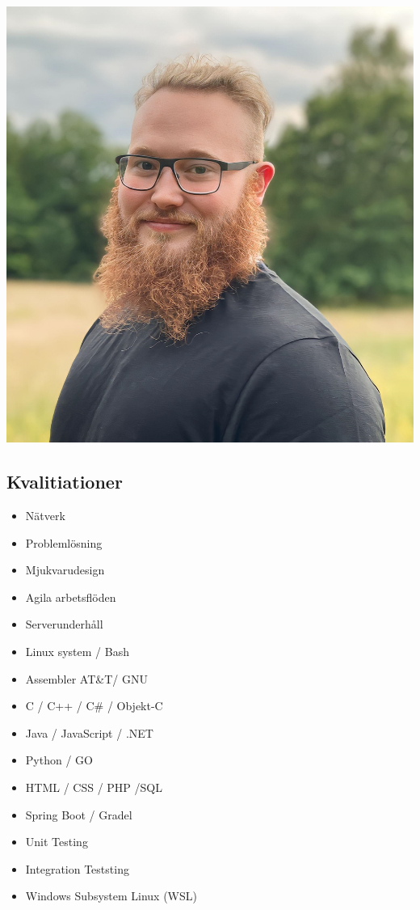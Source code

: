 \documentclass{article}
\begin{document}
\begin{minipage}[t]{0.28\textwidth}
\begin{minipage}[t]{0.8\textwidth}
\vspace{-140pt} %
  \includegraphics[width=\linewidth]{../../me.png}
  \label{fig:bild}
\end{minipage}
\vspace{-10pt} %
\subsection*{\textcolor{colorBlue}{Kvalitiationer}}
\begin{itemize}
  \item Nätverk
  \item Problemlösning
  \item Mjukvarudesign
  \item Agila arbetsflöden
  \item Serverunderhåll
  \item Linux system / Bash
  \item Assembler AT\&T/ GNU
  \item C / C++ / C\# / Objekt-C
  \item Java / JavaScript / .NET
  \item Python / GO
  \item HTML / CSS / PHP /SQL
  \item Spring Boot / Gradel
  \item Unit Testing
  \item Integration Teststing
  \item Windows Subsystem Linux (WSL)
\end{itemize}
\vspace{-10pt} %

\end{minipage}
\end{document}
